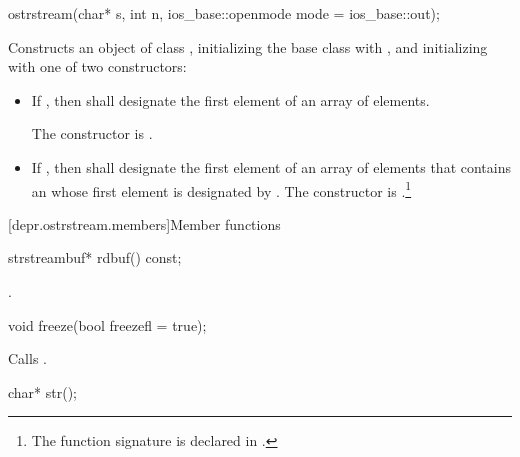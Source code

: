 %
\begin{itemdecl}
ostrstream(char* s, int n, ios_base::openmode mode = ios_base::out);
\end{itemdecl}

\begin{itemdescr}
\pnum
\effects
Constructs an object of class
,
initializing the base class with
,
and initializing  with one of two constructors:

\begin{itemize}
\item
If
,
then  shall designate the first element of an array of  elements.

The constructor is
.
\item
If
,
then  shall designate the first element of an array of  elements that
contains an \ntbs{} whose first element is designated by .
%
The constructor is
.\footnote{The function signature
%
is declared in
%
.}
\end{itemize}
\end{itemdescr}

[depr.ostrstream.members]{Member functions}

%
\begin{itemdecl}
strstreambuf* rdbuf() const;
\end{itemdecl}

\begin{itemdescr}
\pnum
\returns
{}.
\end{itemdescr}

%
\begin{itemdecl}
void freeze(bool freezefl = true);
\end{itemdecl}

\begin{itemdescr}
\pnum
\effects
Calls
.
\end{itemdescr}

%
\begin{itemdecl}
char* str();
\end{itemdecl}

